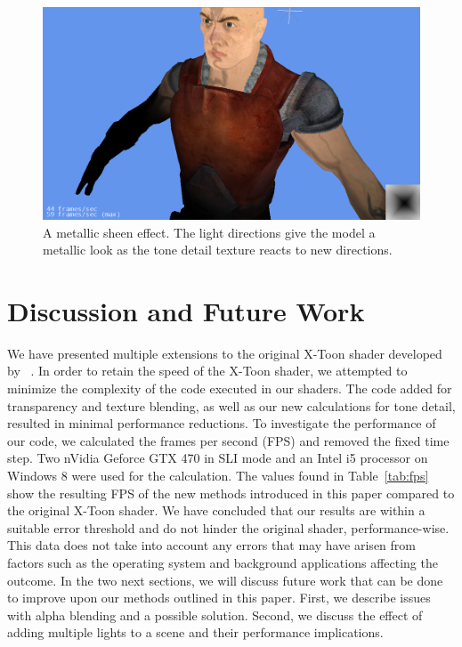 \documentclass[annual]{acmsiggraph}
\begin{document}
\begin{figure}[h]
 \centering
 \includegraphics[width=5.5in]{images/metallic}
 \caption{A metallic sheen effect. The light directions give the model a metallic look as the tone detail texture reacts to new directions.}
 \label{fig:metallic}
\end{figure}


\section{Discussion and Future Work}
\label{sec:discussion}
We have presented multiple extensions to the original X-Toon shader developed by  ~\cite{BTM06a}.  In order to retain the speed of the X-Toon shader, we attempted to minimize the complexity of the code executed in our shaders. The code added for transparency and texture blending, as well as our new calculations for tone detail, resulted in minimal performance reductions. To investigate the performance of our code, we calculated the frames per second (FPS) and removed the fixed time step. Two nVidia Geforce GTX 470 in SLI mode and an Intel i5 processor on Windows 8 were used for the calculation. The values found in Table~\ref{tab:fps} show the resulting FPS of the new methods introduced in this paper compared to the original X-Toon shader. We have concluded that our results are within a suitable error threshold and do not hinder the original shader, performance-wise. This data does not take into account any errors that may have arisen from factors such as the operating system and background applications affecting the outcome. 
In the two next sections, we will discuss future work that can be done to improve upon our methods outlined in this paper. First, we describe issues with alpha blending and a possible solution. Second, we discuss the effect of adding multiple lights to a scene and their performance implications.
\end{document}
